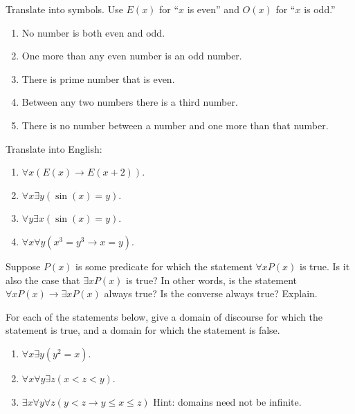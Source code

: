 \documentclass[10pt,]{book}
\theoremstyle{plain}
\theoremstyle{definition}
\theoremstyle{definition}
\theoremstyle{definition}
\theoremstyle{definition}
\numberwithin{equation}{chapter}
\def\imp{\rightarrow}
\newcommand{\lt}{<}
\begin{document}
\begin{divisionexercise}{7}\hypertarget{exercise-183}{}
\hypertarget{p-1523}{}%
Translate into symbols. Use \(E(x)\) for ``\(x\) is even'' and \(O(x)\) for ``\(x\) is odd.''%
\leavevmode%
\begin{enumerate}[label=(\alph*)]
\item\hypertarget{li-381}{}\hypertarget{p-1524}{}%
No number is both even and odd.%
\item\hypertarget{li-382}{}\hypertarget{p-1525}{}%
One more than any even number is an odd number.%
\item\hypertarget{li-383}{}\hypertarget{p-1526}{}%
There is prime number that is even.%
\item\hypertarget{li-384}{}\hypertarget{p-1527}{}%
Between any two numbers there is a third number.%
\item\hypertarget{li-385}{}\hypertarget{p-1528}{}%
There is no number between a number and one more than that number.%
\end{enumerate}
\end{divisionexercise}%
\begin{divisionexercise}{8}\hypertarget{exercise-184}{}
\hypertarget{p-1530}{}%
Translate into English: \leavevmode%
\begin{enumerate}[label=(\alph*)]
\item\hypertarget{li-391}{}\(\forall x (E(x) \imp E(x +2))\).%
\item\hypertarget{li-392}{}\(\forall x \exists y (\sin(x) = y)\).%
\item\hypertarget{li-393}{}\(\forall y \exists x (\sin(x) = y)\).%
\item\hypertarget{li-394}{}\(\forall x \forall y (x^3 = y^3 \imp x = y)\).%
\end{enumerate}
%
\end{divisionexercise}%
\begin{divisionexercise}{9}\hypertarget{exercise-185}{}
\hypertarget{p-1536}{}%
Suppose \(P(x)\) is some predicate for which the statement \(\forall x P(x)\) is true. Is it also the case that \(\exists x P(x)\) is true? In other words, is the statement \(\forall x P(x) \imp \exists x P(x)\) always true? Is the converse always true? Explain.%
\end{divisionexercise}%
\begin{divisionexercise}{10}\hypertarget{exercise-186}{}
\hypertarget{p-1537}{}%
For each of the statements below, give a domain of discourse for which the statement is true, and a domain for which the statement is false.%
\par
\hypertarget{p-1538}{}%
\leavevmode%
\begin{enumerate}[label=(\alph*)]
\item\hypertarget{li-399}{}\(\forall x \exists y (y^2 = x)\).%
\item\hypertarget{li-400}{}\(\forall x \forall y \exists z (x \lt  z \lt  y)\).%
\item\hypertarget{li-401}{}\(\exists x \forall y \forall z (y \lt  z \imp y \le x \le z)\) Hint: domains need not be infinite.%
\end{enumerate}
%
\end{divisionexercise}%
\end{document}
